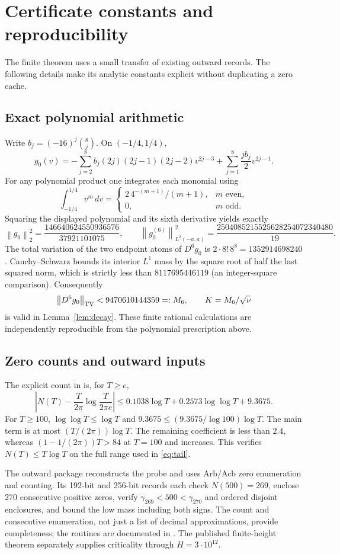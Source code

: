\documentclass[11pt]{article}
\theoremstyle{remark}
\newcommand{\dd}{\,d}
\newcommand{\norm}[1]{\left\|#1\right\|}
\numberwithin{equation}{section}
\begin{document}
\appendix
\section{Certificate constants and reproducibility}\label{app:certificate}
The finite theorem uses a small transfer of existing outward records.
The following details make its analytic constants explicit without
duplicating a zero cache.

\subsection{Exact polynomial arithmetic}
Write $b_j=(-16)^j\binom8j$. On $(-1/4,1/4)$,
\[
g_0(v)=-\sum_{j=2}^8b_j(2j)(2j-1)(2j-2)v^{2j-3}
+\sum_{j=1}^8\frac{j b_j}{2}v^{2j-1}.
\]
For any polynomial product one integrates each monomial using
\[
\int_{-1/4}^{1/4}v^m\dd v=
\begin{cases}2\,4^{-(m+1)}/(m+1),&m\text{ even},\\0,&m\text{ odd}.
\end{cases}
\]
Squaring the displayed polynomial and its sixth derivative yields exactly
\[
\norm{g_0}_2^2=\frac{146640624550936576}{37921101075},\qquad
\norm{g_0^{(6)}}_{L^2(-a,a)}^2
=\frac{2504085215525628254072340480}{19}.
\]
The total variation of the two endpoint atoms of $D^6g_0$ is
$2\cdot8!\,8^8=1352914698240$. Cauchy--Schwarz bounds its interior
$L^1$ mass by the square root of half the last squared norm, which is
strictly less than $8117695446119$ (an integer-square comparison).
Consequently
\[
\norm{D^6g_0}_{\rm TV}<9470610144359=:M_6,\qquad K=M_6/\sqrt\nu
\]
is valid in Lemma~\ref{lem:decay}. These finite rational calculations
are independently reproducible from the polynomial prescription above.

\subsection{Zero counts and outward inputs}
The explicit count in \cite[Corollary 1.2]{HSW} is, for $T\ge e$,
\[
\left|N(T)-\frac{T}{2\pi}\log\frac{T}{2\pi e}\right|
\le0.1038\log T+0.2573\log\log T+9.3675.
\]
For $T\ge100$, $\log\log T\le\log T$ and
$9.3675\le(9.3675/\log100)\log T$.
The main term is at most $(T/(2\pi))\log T$.
The remaining coefficient is less than $2.4$, whereas
$(1-1/(2\pi))T>84$ at $T=100$ and increases. This verifies
$N(T)\le T\log T$ on the full range used in \eqref{eq:tail}.

The outward package \cite{OutwardCertificate} reconstructs the probe
and uses Arb/Acb zero enumeration and counting. Its 192-bit and 256-bit
records each check $N(500)=269$, enclose 270 consecutive positive zeros,
verify $\gamma_{269}<500<\gamma_{270}$ and ordered disjoint enclosures,
and bound the low mass including both signs. The count and consecutive
enumeration, not just a list of decimal approximations, provide
completeness; the routines are documented in \cite{FLINT}.
The published finite-height theorem \cite{PT} separately supplies
criticality through $H=3\cdot10^{12}$.
\end{document}
